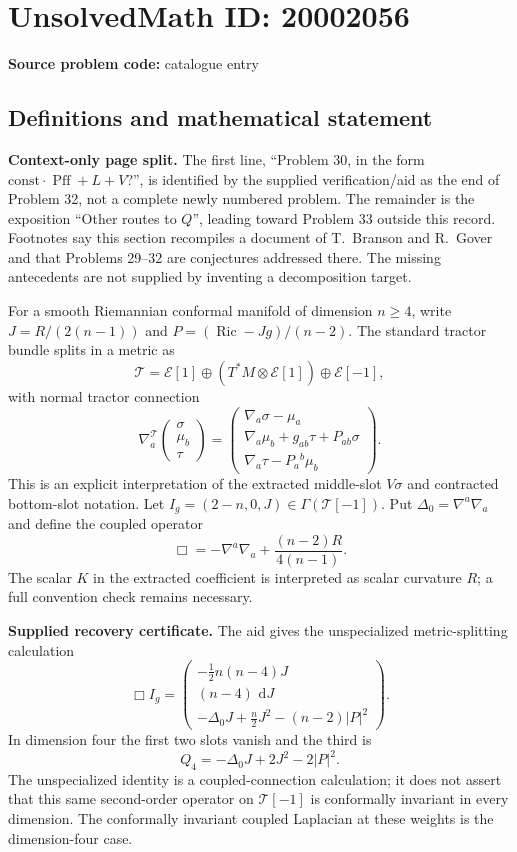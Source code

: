 \documentclass[11pt]{article}
\newcommand{\dd}{\,\mathrm{d}}
\begin{document}
\section*{UnsolvedMath ID: 20002056}
\textbf{Source problem code:} catalogue entry
\subsection{Definitions and mathematical statement}
\textbf{Context-only page split.} The first line, ``Problem 30, in the form $\mathrm{const}\cdot\operatorname{Pff}+L+V$?'', is identified by the supplied verification/aid as the end of Problem 32, not a complete newly numbered problem. The remainder is the exposition ``Other routes to $Q$'', leading toward Problem 33 outside this record. Footnotes say this section recompiles a document of T.~Branson and R.~Gover and that Problems 29--32 are conjectures addressed there. The missing antecedents are not supplied by inventing a decomposition target.

For a smooth Riemannian conformal manifold of dimension $n\ge4$, write $J=R/(2(n-1))$ and $P=(\operatorname{Ric}-Jg)/(n-2)$. The standard tractor bundle splits in a metric as
\[
 \mathcal T=\mathcal E[1]\oplus(T^*M\otimes\mathcal E[1])
                           \oplus\mathcal E[-1],
\]
with normal tractor connection
\[
 \nabla_a^{\mathcal T}\begin{pmatrix}\sigma\\\mu_b\\\tau\end{pmatrix}
 =\begin{pmatrix}
 \nabla_a\sigma-\mu_a\\
 \nabla_a\mu_b+g_{ab}\tau+P_{ab}\sigma\\
 \nabla_a\tau-P_a{}^b\mu_b
 \end{pmatrix}.
\]
This is an explicit interpretation of the extracted middle-slot $V\sigma$ and contracted bottom-slot notation. Let $I_g=(2-n,0,J)\in\Gamma(\mathcal T[-1])$. Put $\Delta_0=\nabla^a\nabla_a$ and define the coupled operator
\[
 \Box=-\nabla^a\nabla_a+\frac{(n-2)R}{4(n-1)}.
\]
The scalar $K$ in the extracted coefficient is interpreted as scalar curvature $R$; a full convention check remains necessary.

\textbf{Supplied recovery certificate.} The aid gives the unspecialized metric-splitting calculation
\[
 \Box I_g=\begin{pmatrix}
 -\tfrac12n(n-4)J\\
 (n-4)\,\dd J\\
 -\Delta_0J+\tfrac n2J^2-(n-2)|P|^2
 \end{pmatrix}.
\]
In dimension four the first two slots vanish and the third is
\[
 Q_4=-\Delta_0J+2J^2-2|P|^2.
\]
The unspecialized identity is a coupled-connection calculation; it does not assert that this same second-order operator on $\mathcal T[-1]$ is conformally invariant in every dimension. The conformally invariant coupled Laplacian at these weights is the dimension-four case.
\end{document}
